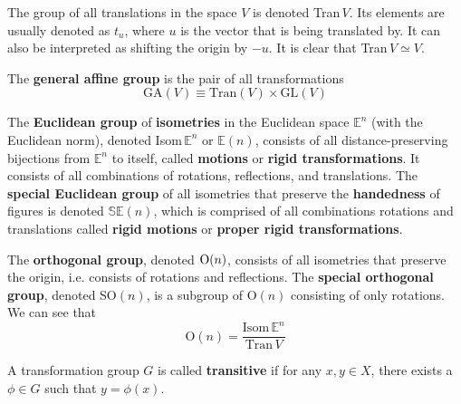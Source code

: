   \begin{definition}
    The group of all translations in the space $V$ is denoted Tran$\,V$. Its elements are usually denoted as $t_{u}$, where $u$ is the vector that is being translated by. It can also be interpreted as shifting the origin by $-u$. It is clear that Tran$\,V \simeq V$. 
  \end{definition}

  \begin{definition}
    The \textbf{general affine group} is the pair of all transformations
    \begin{equation}
      \text{GA} (V) \equiv \text{Tran}(V) \times \text{GL}(V)
    \end{equation}
  \end{definition}

  \begin{definition}[Isometries]
    The \textbf{Euclidean group} of \textbf{isometries} in the Euclidean space $\mathbb{E}^{n}$ (with the Euclidean norm), denoted Isom$\, \mathbb{E}^{n}$ or $\mathbb{E}(n)$, consists of all distance-preserving bijections from $\mathbb{E}^{n}$ to itself, called \textbf{motions} or \textbf{rigid transformations}. It consists of all combinations of rotations, reflections, and translations. The \textbf{special Euclidean group} of all isometries that preserve the \textbf{handedness} of figures is denoted $\mathbb{SE}(n)$, which is comprised of all combinations rotations and translations called \textbf{rigid motions} or \textbf{proper rigid transformations}.
  \end{definition}

  \begin{definition}
    The \textbf{orthogonal group}, denoted $\operatorname{O}(n)$, consists of all isometries that preserve the origin, i.e. consists of rotations and reflections. The \textbf{special orthogonal group}, denoted SO$(n)$, is a subgroup of O$(n)$ consisting of only rotations. We can see that 
    \begin{equation}
      \text{O}(n)=\frac{\text{Isom}\, \mathbb{E}^{n}}{\text{Tran}\,V}
    \end{equation}
  \end{definition}

  \begin{definition}[Transitive]
    A transformation group $G$ is called \textbf{transitive} if for any $x, y \in X$, there exists a $\phi \in G$ such that $y = \phi(x)$. 
  \end{definition}

